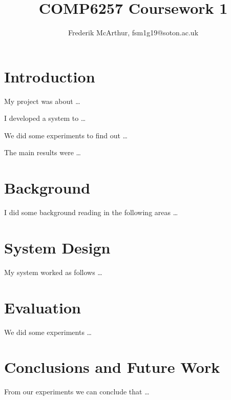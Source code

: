 \documentclass[a4paper, 11pt]{article}
\title{COMP6257 Coursework 1}
\author{Frederik McArthur, fsm1g19@soton.ac.uk}
\begin{document}
\maketitle
\tableofcontents

\section{Introduction}

My project was about \ldots

I developed a system to \ldots

We did some experiments to find out \ldots

The main results were \ldots

\pagebreak

\section{Background}

I did some background reading in the following areas \ldots

\pagebreak

\section{System Design}

My system worked as follows \ldots

\pagebreak

\section{Evaluation}

We did some experiments \ldots

\pagebreak

\section{Conclusions and Future Work}

From our experiments we can conclude that \ldots


\end{document}

